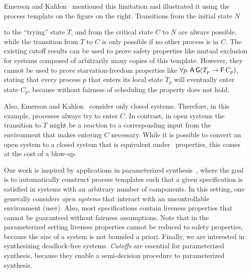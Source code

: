 Emerson and Kahlon~\cite{Emerson00} mentioned this limitation and illustrated it
using the process template on the figure on the right.
Transitions from the initial state $N$
\begin{wrapfigure}{r}{0.28\linewidth}
\vspace{-9pt}
\scalebox{0.84}{

}
\label{fig:mutex}
\vspace{-20pt}
\end{wrapfigure}
to the ``trying'' state $T$, and from the critical state $C$ to $N$ are always 
possible, while the transition from $T$ to $C$ is only possible if no other 
process is in $C$. The existing cutoff results can be 
used to prove safety properties like mutual exclusion for systems composed of 
arbitrarily many copies of this template. However, they cannot be used to prove 
starvation-freedom properties like 
$\forall{p}. \operatorname{\mathsf{A}} \operatorname{\mathsf{G}} (T_p \rightarrow \operatorname{\mathsf{F}} C_p)$,
stating that every process $p$ that enters its local state $T_p$ will 
eventually enter state $C_p$, because without fairness 
of scheduling the property does not hold. 

Also, Emerson and Kahlon~\cite{Emerson00} consider only closed systems. 
Therefore, in this example, processes always try to enter $C$. 
In contrast, in open systems the transition to $T$ might be a reaction 
to a corresponding input from the environment that makes entering $C$ necessary. While it is possible to convert an open system to a closed system that is equivalent under \LTL\ properties, this comes at the cost of a blow-up.

\smallskip
{} Our work is inspired by applications in
parameterized synthesis~\cite{JB14}, where the goal is to automatically
construct process templates such that a given specification is satisfied in
systems with an arbitrary number of components.
In this setting,
one generally considers \emph{open systems} that interact with an uncontrollable environment (user).
Also, most specifications contain liveness properties that cannot be guaranteed without fairness assumptions.
Note that in the parameterized setting liveness properties cannot be reduced to safety properties,
because the size of a system is not bounded a priori.
Finally, we are interested in synthesizing deadlock-free systems.
\emph{Cutoffs} are essential for parameterized synthesis,
because they enable a semi-decision procedure to parameterized synthesis.

